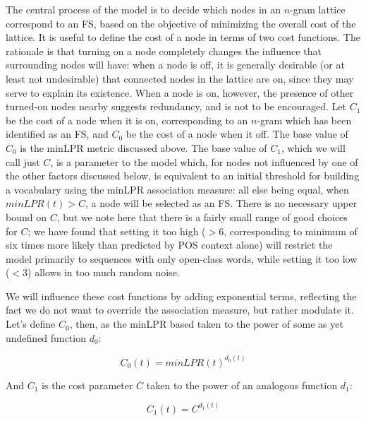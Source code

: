 \documentclass[11pt,letterpaper]{article}
\begin{document}
The central process of the model is to decide which nodes in an $n$-gram lattice correspond to an FS, based on the objective of minimizing the overall cost of the lattice. It is useful to define the cost of a node in terms of two cost functions. The rationale is that turning on a node completely changes the influence that surrounding nodes will have: when a node is off, it is generally desirable (or at least not undesirable) that connected nodes in the lattice are on, since they may serve to explain its existence. When a node is on, however, the presence of other turned-on nodes nearby suggests redundancy, and is not to be encouraged. Let $C_{1}$ be the cost of a node when it is on, corresponding to an $n$-gram which has been identified as an FS, and $C_{0}$ be the cost of a node when it off. The base value of $C_{0}$ is the minLPR metric discussed above. The base value of $C_{1}$, which we will call just $C$, is a parameter to the model which, for nodes not influenced by one of the other factors discussed below, is equivalent to an initial threshold for building a vocabulary using the minLPR association measure: all else being equal, when $minLPR(t) > C$, a node will be selected as an FS. There is no necessary upper bound on $C$, but we note here that there is a fairly small range of good choices for $C$; we have found that setting it too high ($>6$, corresponding to minimum of six times more likely than predicted by POS context alone) will restrict the model primarily to sequences with only open-class words, while setting it too low ($<3$) allows in too much random noise.


We will influence these cost functions by adding exponential terms, reflecting the fact we do not want to override the association measure, but rather modulate it. Let's define $C_0$, then, as the minLPR based taken to the power of some as yet undefined function $d_0$:

\begin{displaymath}
C_0(t) = minLPR(t)^{d_0(t)}
\end{displaymath}
\noident

And $C_1$ is the cost parameter $C$ taken to the power of an analogous function $d_1$:

\begin{displaymath}
C_1(t) = C^{d_1(t)}
\end{displaymath}
\noident
\end{document}
